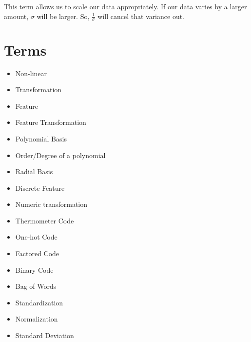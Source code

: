                 This term allows us to scale our data appropriately. If our data varies by a larger amount, $\sigma$ will be larger. So, $\frac{1}{\sigma}$ will cancel that variance out.

                
                
                
\pagebreak

\section{Terms}

    \begin{itemize}
        \item Non-linear
        \item Transformation
        \item Feature
        \item Feature Transformation
        \item Polynomial Basis
        \item Order/Degree of a polynomial
        \item Radial Basis
        \item Discrete Feature
        \item Numeric transformation
        \item Thermometer Code
        \item One-hot Code
        \item Factored Code
        \item Binary Code
        \item Bag of Words
        \item Standardization
        \item Normalization
        \item Standard Deviation
        
    \end{itemize}
                
                
            


